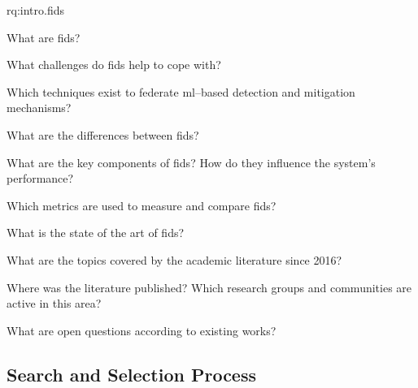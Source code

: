 \begin{subquestions}{rq:intro.fids}
    \item What are \gls{fids}?
    \begin{questions}
        \item What challenges do \gls{fids} help to cope with? \label{rq:sota.challenges}
        \item Which techniques exist to federate \gls{ml}--based detection and mitigation mechanisms? \label{rq:sota.techniques}
    \end{questions}

    \item What are the differences between \gls{fids}?
    \begin{questions}
        \item What are the key components of \gls{fids}? How do they influence the system's performance? \label{rq:sota.components}
        \item Which metrics are used to measure and compare \gls{fids}? \label{rq:sota.metrics}
    \end{questions}

    \item What is the state of the art of \gls{fids}?
    \begin{questions}
        \item What are the topics covered by the academic literature since 2016? \label{rq:sota.literature}
        \item Where was the literature published? Which research groups and communities are active in this area? \label{rq:sota.wherewho}
        \item What are open questions according to existing works? \label{rq:sota.open}
    \end{questions}
\end{subquestions}


\subsection{Search and Selection Process\label{sec:sota.methodo.search}}

